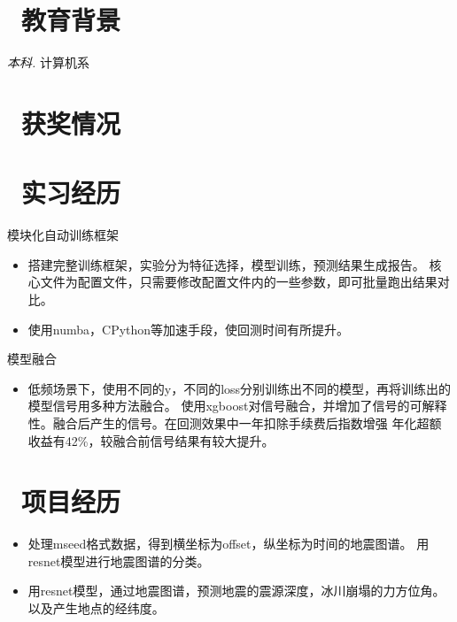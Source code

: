 \documentclass{resume}
\begin{document}


 
\section{\faGraduationCap\  教育背景}
\datedsubsection{\textbf{北京大学}}{2021 -- 2025}
\textit{本科.} 计算机系

\section{\faHeartO\ 获奖情况}

\section{\faUsers\ 实习经历}
模块化自动训练框架
\begin{itemize}
  \item 搭建完整训练框架，实验分为特征选择，模型训练，预测结果生成报告。 核心文件为配置文件，只需要修改配置文件内的一些参数，即可批量跑出结果对比。
  \item 使用numba，CPython等加速手段，使回测时间有所提升。
\end{itemize}
模型融合
\begin{itemize}
  \item 低频场景下，使用不同的y，不同的loss分别训练出不同的模型，再将训练出的模型信号用多种方法融合。
使用xgboost对信号融合，并增加了信号的可解释性。融合后产生的信号。在回测效果中一年扣除手续费后指数增强
年化超额收益有42\%，较融合前信号结果有较大提升。
\end{itemize}

\section{\faObjectGroup\ 项目经历}
\begin{itemize}
  \item 处理mseed格式数据，得到横坐标为offset，纵坐标为时间的地震图谱。
用resnet模型进行地震图谱的分类。
  \item 用resnet模型，通过地震图谱，预测地震的震源深度，冰川崩塌的力方位角。以及产生地点的经纬度。
\end{itemize}
\end{document}
